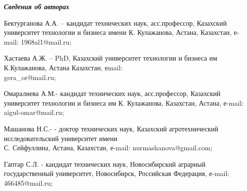 \begin{authorinfo}
\emph{{\bfseries Сведения об авторах}}

Бектурганова А.А. -- кандидат технических наук, асс.профессор, Казахский
университет технологии и бизнеса имени К. Кулажанова, Астана, Казахстан,
е-mail: 1968al1@mail.ru;

Хастаева А.Ж. -- PhD, Казахский университет технологии и бизнеса им
К.Кулажанова, Астана Казахстан, еmail: \\gera\_or@mail.ru;

Омаралиева А.М.- кандидат технических наук, асс.профессор, Казахский
университет технологии и бизнеса им К. Кулажанова, Казахстан, Астана,
е-mail: aigul-omar@mail.ru;

Машанова Н.С.- - доктор технических наук, Казахский агротехнический
исследовательский университет имени \\С. Сейфуллина, Астана, Казахстан,
е-mail: nurmashanova@gmail.com;

Гаптар С.Л. - кандидат технических наук, Новосибирский аграрный
государственный университет, Новосибирск, Российская Федерация, е-mail:
466485@mail.ru;
\end{authorinfo}
